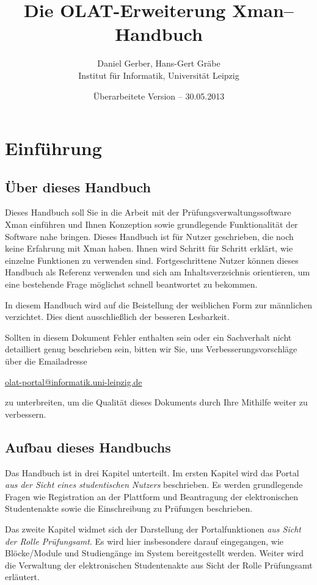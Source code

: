 \documentclass[a4paper,11pt]{article}
\author{Daniel Gerber, Hans-Gert Gräbe\\ 
Institut für Informatik, Universität Leipzig}
\title{Die OLAT-Erweiterung Xman-- Handbuch}
\date{Überarbeitete Version -- 30.05.2013}
\begin{document}
\maketitle

\tableofcontents

\section*{Einführung}

\subsection*{Über dieses Handbuch}

Dieses Handbuch soll Sie in die Arbeit mit der Prüfungsverwaltungssoftware
Xman einführen und Ihnen Konzeption sowie grundlegende Funktionalität der
Software nahe bringen. Dieses Handbuch ist für Nutzer geschrieben, die noch
keine Erfahrung mit Xman haben. Ihnen wird Schritt für Schritt erklärt, wie
einzelne Funktionen zu verwenden sind.  Fortgeschrittene Nutzer können dieses
Handbuch als Referenz verwenden und sich am Inhaltsverzeichnis orientieren, um
eine bestehende Frage möglichst schnell beantwortet zu bekommen.

In diesem Handbuch wird auf die Beistellung der weiblichen Form zur männlichen
verzichtet. Dies dient ausschließlich der besseren Lesbarkeit.

Sollten in diesem Dokument Fehler enthalten sein oder ein Sachverhalt nicht
detailliert genug beschrieben sein, bitten wir Sie, uns
Verbesserungsvorschläge über die Emailadresse
\begin{center}
  \url{olat-portal@informatik.uni-leipzig.de} 
\end{center}
zu unterbreiten, um die Qualität dieses Dokuments durch Ihre Mithilfe weiter
zu verbessern.

\subsection*{Aufbau dieses Handbuchs}

Das Handbuch ist in drei Kapitel unterteilt. Im ersten Kapitel wird das Portal
{\em aus der Sicht eines studentischen Nutzers} beschrieben. Es werden
grundlegende Fragen wie Registration an der Plattform und Beantragung der
elektronischen Studentenakte sowie die Einschreibung zu Prüfungen beschrieben.

Das zweite Kapitel widmet sich der Darstellung der Portalfunktionen {\em aus
  Sicht der Rolle Prüfungsamt}. Es wird hier insbesondere darauf eingegangen,
wie Blöcke/Module und Studiengänge im System bereitgestellt werden.  Weiter
wird die Verwaltung der elektronischen Studentenakte aus Sicht der Rolle
Prüfungsamt erläutert.
\end{document}
